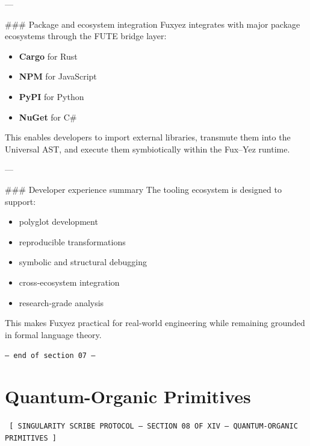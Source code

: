 \documentclass[12pt, a4paper]{book}
\begin{document}
---

\#\#\# Package and ecosystem integration  
Fuxyez integrates with major package ecosystems through the FUTE bridge layer:

\begin{itemize}
  \item \textbf{Cargo} for Rust  
  \item \textbf{NPM} for JavaScript  
  \item \textbf{PyPI} for Python  
  \item \textbf{NuGet} for C\#  
\end{itemize}

This enables developers to import external libraries, transmute them into the Universal AST, and execute them symbiotically within the Fux–Yez runtime.

---

\#\#\# Developer experience summary  
The tooling ecosystem is designed to support:

\begin{itemize}
  \item polyglot development  
  \item reproducible transformations  
  \item symbolic and structural debugging  
  \item cross‑ecosystem integration  
  \item research‑grade analysis  
\end{itemize}

This makes Fuxyez practical for real-world engineering while remaining grounded in formal language theory.
    
    \vspace{1cm}
    \begin{center}
    \color{alienPurple}\texttt{--- end of section 07 ---}
    \end{center}
    \clearpage
    

    \chapter*{Quantum-Organic Primitives}
    
    
    \begin{glyphbox}
    \centering
    \color{neonCyan}\fontsize{8}{10}\selectfont\texttt{
    [ SINGULARITY SCRIBE PROTOCOL -- SECTION 08 OF XIV -- QUANTUM-ORGANIC PRIMITIVES ]
    }
    \end{glyphbox}
    \vspace{0.3cm}
    
\end{document}
